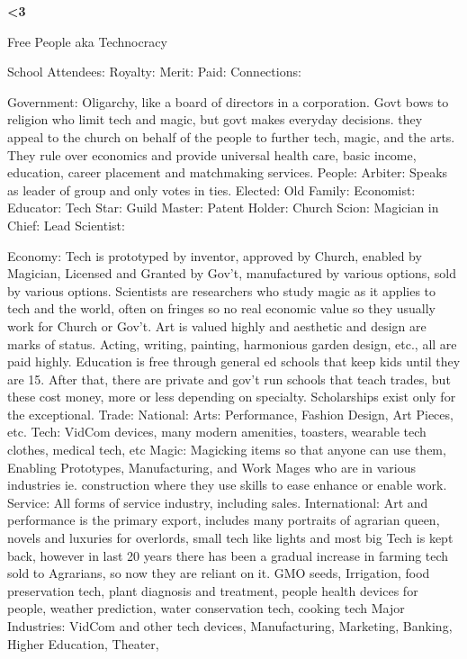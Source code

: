 \documentclass[blue]{GL2020}
\begin{document}
\name{\bTest{}}

\bf{<3}

Free People aka Technocracy

School Attendees:
	Royalty:
	Merit:
	Paid:
	Connections:

Government:  Oligarchy, like a board of directors in a corporation.  Govt bows to religion who limit tech and magic, but govt makes everyday decisions.  they appeal to the church on behalf of the people to further tech, magic, and the arts.  They rule over economics and provide universal health care, basic income, education, career placement and matchmaking services.
	People:		Arbiter:	Speaks as leader of group and only votes in ties.
						Elected:	
						Old Family:
						Economist:
						Educator:
						Tech Star:
						Guild Master:
						Patent Holder:
						Church Scion:
						Magician in Chief:
						Lead Scientist:
	
Economy:		Tech is prototyped by inventor, approved by Church, enabled by Magician, Licensed and Granted 
						by Gov't, manufactured by various options, sold by various options.  Scientists are researchers 
						who study magic as it applies to tech and the world, often on fringes so no real economic value 
						so they usually work for Church or Gov't.
						Art is valued highly and aesthetic and design are marks of status.  Acting, writing, painting,
						harmonious garden design, etc., all are paid highly.
						Education is free through general ed schools that keep kids until they are 15.  After that, there
						are private and gov't run schools that teach trades, but these cost money, more or less depending 
						on specialty.  Scholarships exist only for the exceptional.
	Trade:		National:		Arts:		Performance, Fashion Design, Art Pieces, etc.
												Tech:		VidCom devices, many modern amenities, toasters, wearable tech clothes, 
												medical tech, etc
												Magic:		Magicking items so that anyone can use them, Enabling Prototypes,
												Manufacturing, and Work Mages who are in various industries ie. construction 
												where they use skills to ease enhance or enable work.
												Service:		All forms of service industry, including sales.
						International:		Art and performance is the primary export, includes many portraits of agrarian queen, novels and luxuries for overlords, small tech like lights and most big Tech is kept back, however in last 20 years there has been a gradual increase in farming tech sold to Agrarians, so now they are reliant on it.  GMO seeds, Irrigation, food preservation tech, plant diagnosis and treatment, people health devices for people, weather prediction, water conservation tech, cooking tech
	Major Industries:  VidCom and other tech devices, Manufacturing, Marketing, Banking, Higher Education, Theater, 
	
\end{document}
